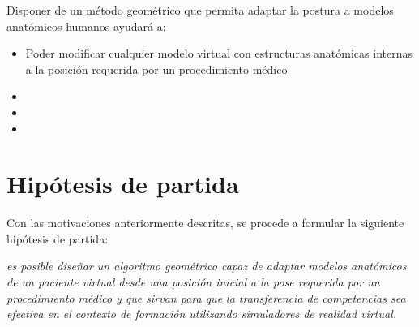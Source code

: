 Disponer de un método geométrico que permita adaptar la postura a modelos anatómicos humanos ayudará a:

\begin{itemize}
    \item Poder modificar cualquier modelo virtual con estructuras anatómicas internas a la posición requerida por un procedimiento médico.
    \item {}
    \item {}
    \item {}
\end{itemize}


\section{Hipótesis de partida} 
\label{intro:hipotesis}
Con las motivaciones anteriormente descritas, se procede a formular la siguiente hipótesis de partida:



\begin{center}
    \begin{minipage}{0.9\linewidth}
        {\small
\emph{es posible diseñar un algoritmo geométrico capaz de adaptar modelos anatómicos de un paciente virtual desde una posición inicial a la pose requerida por un procedimiento médico y que sirvan para que la transferencia de competencias sea efectiva en el contexto de formación utilizando simuladores de realidad virtual. }
        }
    \end{minipage}
    
    
\end{center}




